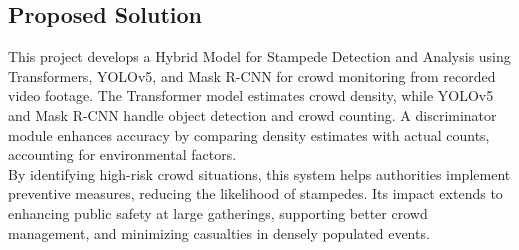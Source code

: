 \documentclass[11pt]{report}
\begin{document}
    \subsection{Proposed Solution}
This project develops a Hybrid Model for Stampede Detection and Analysis using Transformers, YOLOv5, and Mask R-CNN for crowd monitoring from recorded video footage. The Transformer model estimates crowd density, while YOLOv5 and Mask R-CNN handle object detection and crowd counting. A discriminator module enhances accuracy by comparing density estimates with actual counts, accounting for environmental factors. \\

By identifying high-risk crowd situations, this system helps authorities implement preventive measures, reducing the likelihood of stampedes. Its impact extends to enhancing public safety at large gatherings, supporting better crowd management, and minimizing casualties in densely populated events.
\end{document}
